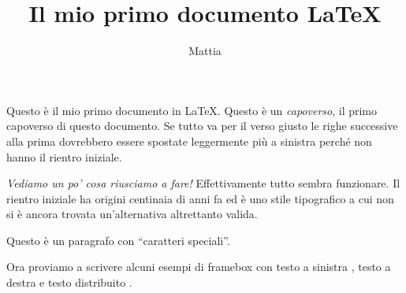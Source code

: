 \documentclass[a4paper, 12pt]{article}
\begin{document}
\title{Il mio primo documento LaTeX}
\author{Mattia}
\date{}
\maketitle

Questo è il mio primo documento in \LaTeX{}.
Questo è un \textit{capoverso}, il primo capoverso di questo documento.
Se tutto va per il verso giusto le righe successive alla prima dovrebbero essere spostate leggermente più a sinistra perché non hanno il rientro iniziale.

\emph{Vediamo un po' cosa riusciamo a fare!}
Effettivamente tutto sembra funzionare.
Il rientro iniziale ha origini centinaia di anni fa ed è uno stile tipografico a cui non si è ancora trovata un'alternativa altrettanto valida.

\small Questo \`{e} un paragrafo con ``caratteri speciali''.

Ora proviamo a scrivere alcuni esempi di framebox con testo a sinistra , testo a destra  e testo distribuito .
\end{document}

